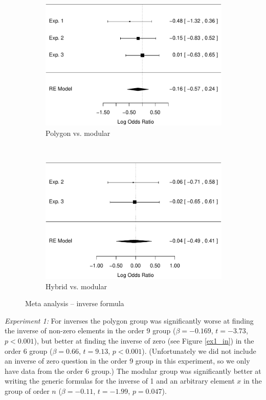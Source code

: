 \documentclass[man,10pt]{apa6}
\begin{document}
\begin{figure}
\centering
\begin{subfigure}[c]{0.4\textwidth}
\centering
\includegraphics[width=\textwidth]{figures/meta/question_typeinverse_formula_n_conditionpolygon.pdf}
\caption{Polygon vs. modular}
\end{subfigure}
~
\begin{subfigure}[c]{0.4\textwidth}
\centering
\includegraphics[width=\textwidth]{figures/meta/question_typeinverse_formula_n_conditionhybrid.pdf}
\caption{Hybrid vs. modular}
\end{subfigure}
\caption{Meta analysis -- inverse formula}
\label{meta_in_f}
\end{figure}\noindent 
\textit{Experiment 1:} For inverses the polygon group was significantly worse at finding the inverse of non-zero elements in the order 9 group ($\beta = -0.169$, $t=-3.73$, $p < 0.001$), but better at finding the inverse of zero (see Figure \ref{ex1_in}) in the order 6 group ($\beta = 0.66$, $t=9.13$, $p < 0.001$). (Unfortunately we did not include an inverse of zero question in the order 9 group in this experiment, so we only have data from the order 6 group.) The modular group was significantly better at writing the generic formulas for the inverse of 1 and an arbitrary element $x$ in the group of order $n$ ($\beta = -0.11$, $t=-1.99$, $p = 0.047$). \par
\end{document}
